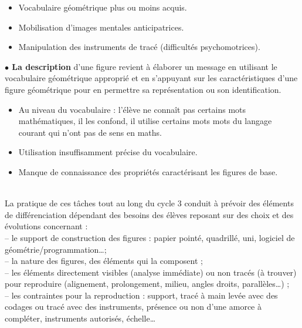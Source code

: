 {\renewcommand{\StringDOCUMENTATION}{Difficultés liées aux tâches construction}
\begin{documentation}
\begin{itemize}
   \item Vocabulaire géométrique plus ou moins acquis.
   \item Mobilisation d'images mentales anticipatrices.
   \item Manipulation des instruments de tracé (difficultés psychomotrices). \\ [-8mm]
\end{itemize}
\end{documentation}}

\bigskip

\textbf{$\bullet$ La description} d'une figure revient à élaborer un message en utilisant le vocabulaire géométrique approprié et en s’appuyant sur les caractéristiques d’une figure géométrique pour en permettre sa représentation ou son identification.

{\renewcommand{\StringDOCUMENTATION}{Difficultés liées aux tâches de description}
\begin{documentation}
 \begin{itemize}
    \item Au niveau du vocabulaire : l'élève ne connaît pas certains mots mathématiques, il les confond, il utilise certains mots mots du langage courant qui n'ont pas de sens en maths.
   \item Utilisation insuffisamment précise du vocabulaire.
   \item Manque de connaissance des propriétés caractérisant les figures de base. \\ [-8mm]
\end{itemize}
\end{documentation}}

\ \\

La pratique de ces tâches tout au long du cycle 3 conduit à prévoir des éléments de différenciation dépendant des besoins des élèves reposant sur des choix et des évolutions concernant : \\
-- le support de construction des figures : papier pointé, quadrillé, uni, logiciel de géométrie/programmation\dots ; \\
-- la nature des figures, des éléments qui la composent ; \\
-- les éléments directement visibles (analyse immédiate) ou non tracés (à trouver) pour reproduire (alignement, prolongement, milieu, angles droits, parallèles\dots) ; \\
-- les contraintes pour la reproduction : support, tracé à main levée avec des codages ou tracé avec des instruments, présence ou non d’une amorce à compléter, instruments autorisés, échelle\dots


